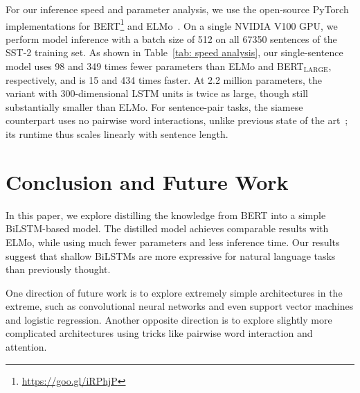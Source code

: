 \documentclass[11pt,a4paper]{article}
\begin{document}
For our inference speed and parameter analysis, we use the open-source PyTorch implementations for BERT\footnote{\url{https://goo.gl/iRPhjP}} and ELMo~\cite{Gardner2017AllenNLP}.
On a single NVIDIA V100 GPU, we perform model inference with a batch size of 512 on all 67350 sentences of the SST-2 training set.
As shown in Table~\ref{tab: speed analysis}, our single-sentence model uses 98 and 349 times fewer parameters than ELMo and BERT$_{\text{LARGE}}$, respectively, and is 15 and 434 times faster.
At 2.2 million parameters, the variant with 300-dimensional LSTM units is twice as large, though still substantially smaller than ELMo.
For sentence-pair tasks, the siamese counterpart uses no pairwise word interactions, unlike previous state of the art~\cite{he2016pairwise}; its runtime thus scales linearly with sentence length.




\begin{table}[t]
\caption{Single-sentence model size and inference speed on SST-2. \# of Par. denotes number of millions of parameters, and inference time is in seconds.}
\label{tab: speed analysis}
\end{table}


\section{Conclusion and Future Work}
In this paper, we explore distilling the knowledge from BERT into a simple BiLSTM-based model.
The distilled model achieves comparable results with ELMo, while using much fewer parameters and less inference time.
Our results suggest that shallow BiLSTMs are more expressive for natural language tasks than previously thought.

One direction of future work is to explore extremely simple architectures in the extreme, such as convolutional neural networks and even support vector machines and logistic regression. Another opposite direction is to explore slightly more complicated architectures using tricks like pairwise word interaction and attention.
\end{document}
